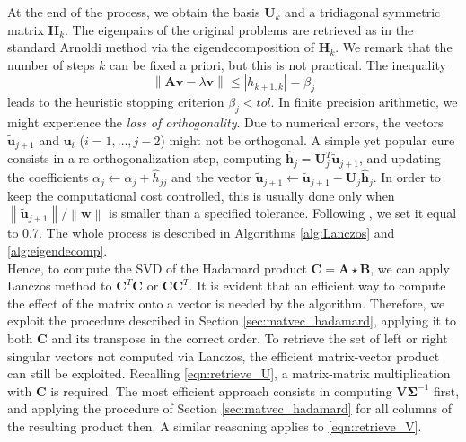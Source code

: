 \documentclass[10pt,titlepage]{article}
\numberwithin{equation}{section}
\numberwithin{figure}{section}
\newcommand{\norm}[1]{\left\lVert#1\right\rVert}
\newcommand{\hadamard}[2]{\mathbf{#1} \star \mathbf{#2}}
\begin{document}
At the end of the process, we obtain the basis $\mathbf{U}_k$ and a tridiagonal symmetric matrix $\mathbf{H}_k$. The eigenpairs of the original problems are retrieved as in the standard Arnoldi method via the eigendecomposition of $\mathbf{H}_k$. We remark that the number of steps $k$ can be fixed a priori, but this is not practical. The inequality
\begin{equation}
	\norm{\mathbf{A}\mathbf{v}-\lambda\mathbf{v}} \leq |h_{k+1,k}|=\beta_j
\end{equation}
leads to the heuristic stopping criterion $\beta_j < tol$. In finite precision arithmetic, we might experience the \textit{loss of orthogonality}. Due to numerical errors, the vectors $\tilde{\mathbf{u}}_{j+1}$ and $\mathbf{u}_i$ ($i=1,\dots,j-2$) might not be orthogonal. A simple yet popular cure consists in a re-orthogonalization step, computing $\hat{\mathbf{h}}_j=\mathbf{U}^T_j \tilde{\mathbf{u}}_{j+1}$, and updating the coefficients $\alpha_j \leftarrow \alpha_j+\hat{h}_{jj}$ and the vector $\tilde{\mathbf{u}}_{j+1} \leftarrow \tilde{\mathbf{u}}_{j+1}-\mathbf{U}_j\hat{\mathbf{h}}_j$. In order to keep the computational cost controlled, this is usually done only when $\norm{\tilde{\mathbf{u}}_{j+1}}/\norm{\mathbf{w}}$ is smaller than a specified tolerance. Following \cite{Massei}, we set it equal to 0.7.
The whole process is described in Algorithms \ref{alg:Lanczos} and \ref{alg:eigendecomp}. \\
Hence, to compute the SVD of the Hadamard product $\mathbf{C}=\hadamard{A}{B}$, we can apply Lanczos method to $\mathbf{C}^T \mathbf{C}$ or $\mathbf{C} \mathbf{C}^T$. It is evident that an efficient way to compute the effect of the matrix onto a vector is needed by the algorithm. Therefore, we exploit the procedure described in Section \ref{sec:matvec_hadamard}, applying it to both $\mathbf{C}$ and its transpose in the correct order. To retrieve the set of left or right singular vectors not computed via Lanczos, the efficient matrix-vector product can still be exploited. Recalling \eqref{eqn:retrieve_U}, a matrix-matrix multiplication with $\mathbf{C}$ is required. The most efficient approach consists in computing $\mathbf{V} \mathbf{\Sigma}^{-1}$ first, and applying the procedure of Section \ref{sec:matvec_hadamard} for all columns of the resulting product then. A similar reasoning applies to \eqref{eqn:retrieve_V}.
\end{document}
